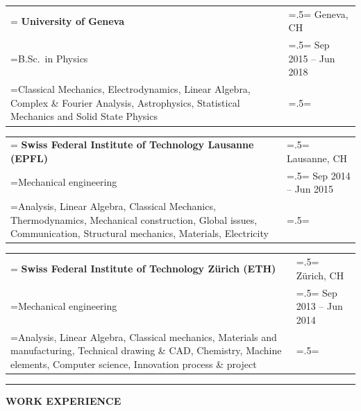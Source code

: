 \documentclass[letterpaper, 11pt]{article}
\begin{document}
\begin{tabularx}{1.0\textwidth} { 
   >{\raggedright\arraybackslash\hsize=1.5\hsize\linewidth=\hsize}X 
   >{\raggedleft\arraybackslash\hsize=.5\hsize\linewidth=\hsize}X }
\normalsize
\bf{University of Geneva} & Geneva, CH \\
\normalfont B.Sc.\ in Physics & Sep 2015 -- Jun 2018  \\  
Classical Mechanics, Electrodynamics, Linear Algebra, Complex \& Fourier Analysis, Astrophysics, Statistical Mechanics and Solid State Physics &
\end{tabularx}
\vspace{0.25cm}

\begin{tabularx}{1.0\textwidth} { 
   >{\raggedright\arraybackslash\hsize=1.5\hsize\linewidth=\hsize}X 
   >{\raggedleft\arraybackslash\hsize=.5\hsize\linewidth=\hsize}X }
\normalsize
\bf{Swiss Federal Institute of Technology Lausanne (EPFL)} & Lausanne, CH \\
\normalfont Mechanical engineering & Sep 2014 -- Jun 2015\\
Analysis, Linear Algebra, Classical Mechanics, Thermodynamics, Mechanical construction, Global issues, Communication, Structural mechanics, Materials, Electricity
\end{tabularx}
\vspace{0.25cm}

\begin{tabularx}{1.0\textwidth} { 
   >{\raggedright\arraybackslash\hsize=1.5\hsize\linewidth=\hsize}X 
   >{\raggedleft\arraybackslash\hsize=.5\hsize\linewidth=\hsize}X }
\normalsize
\bf{Swiss Federal Institute of Technology Zürich (ETH)} & Zürich, CH \\
\normalfont Mechanical engineering & Sep 2013 -- Jun 2014 \\
Analysis, Linear Algebra, Classical mechanics, Materials and manufacturing, Technical drawing \& CAD, Chemistry, Machine elements, Computer science, Innovation process \& project
\end{tabularx}
\vspace{0.25cm}

\begin{center}
\noindent\rule{0.75\textwidth}{1pt}
\end{center}

\begin{center}
\large\bf{WORK EXPERIENCE}
\end{center}
\end{document}
